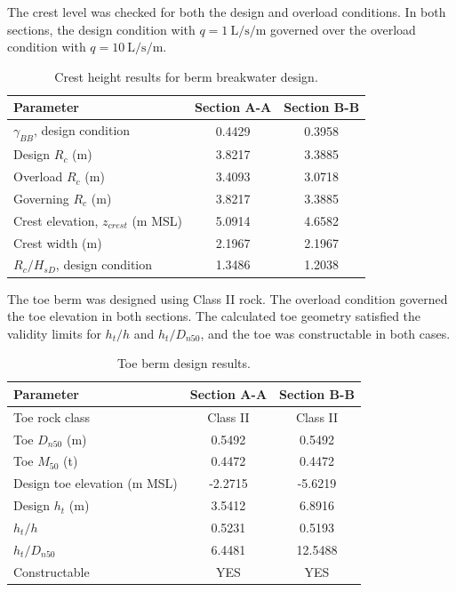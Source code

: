\documentclass[a4paper, 11pt]{article}
\begin{document}
The crest level was checked for both the design and overload conditions. In both sections, the design condition with \(q=1~\mathrm{L/s/m}\) governed over the overload condition with \(q=10~\mathrm{L/s/m}\).

\begin{table}[H]
\centering
\caption{Crest height results for berm breakwater design.}
\label{tab:berm_crest}
\begin{tabular}{l c c}
\hline
Parameter & Section A-A & Section B-B \\
\hline
\(\gamma_{BB}\), design condition & 0.4429 & 0.3958 \\
Design \(R_c\) (m) & 3.8217 & 3.3885 \\
Overload \(R_c\) (m) & 3.4093 & 3.0718 \\
Governing \(R_c\) (m) & 3.8217 & 3.3885 \\
Crest elevation, \(z_{crest}\) (m MSL) & 5.0914 & 4.6582 \\
Crest width (m) & 2.1967 & 2.1967 \\
\(R_c/H_{sD}\), design condition & 1.3486 & 1.2038 \\
\hline
\end{tabular}
\end{table}

The toe berm was designed using Class II rock. The overload condition governed the toe elevation in both sections. The calculated toe geometry satisfied the validity limits for \(h_t/h\) and \(h_t/D_{n50}\), and the toe was constructable in both cases.

\begin{table}[H]
\centering
\caption{Toe berm design results.}
\label{tab:berm_toe}
\begin{tabular}{l c c}
\hline
Parameter & Section A-A & Section B-B \\
\hline
Toe rock class & Class II & Class II \\
Toe \(D_{n50}\) (m) & 0.5492 & 0.5492 \\
Toe \(M_{50}\) (t) & 0.4472 & 0.4472 \\
Design toe elevation (m MSL) & -2.2715 & -5.6219 \\
Design \(h_t\) (m) & 3.5412 & 6.8916 \\
\(h_t/h\) & 0.5231 & 0.5193 \\
\(h_t/D_{n50}\) & 6.4481 & 12.5488 \\
Constructable & YES & YES \\
\hline
\end{tabular}
\end{table}
\end{document}
